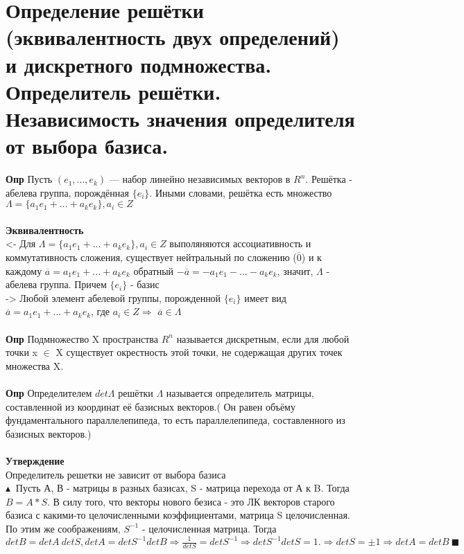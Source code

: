 \section{Определение решётки (эквивалентность двух определений) и дискретного подмножества. Определитель решётки. Независимость значения определителя от выбора базиса.}
\textbf{Опр} Пусть $( e_1, . . . , e_k)$ — набор линейно независимых векторов в $R^n$. Решётка - абелева группа, порождённая $\{e_i\}$. Иными словами, решётка есть множество $\Lambda = \{a_1 e_1 + ... + a_k e_k\}, a_i \in Z$
\\
\\
\textbf{Эквивалентность}\\
<- Для $\Lambda = \{a_1 e_1 + ... + a_k e_k\}, a_i \in Z$ выполяняются ассоциативность и коммутативность сложения, существует нейтральный по сложению ($\overline{0}$) и к каждому $\overline{a} = a_1 e_1 + ... + a_k e_k$ обратный $-\overline{a} = -a_1 e_1 - ... - a_k e_k$, значит, $\Lambda$ - абелева группа. Причем $\{e_i\}$ - базис\\
-> Любой элемент абелевой группы, порожденной $\{e_i\}$ имеет вид $\overline{a} = a_1 e_1 + ... + a_k e_k$, где $a_i \in Z \Longrightarrow$  $\overline{a} \in \Lambda$
\\
\\
\textbf{Опр} Подмножество X пространства $R^n$ называется дискретным, если для любой точки x $\in$ X существует окрестность этой точки, не содержащая других точек множества X.
\\
\\
\textbf{Опр} Определителем $det \Lambda$ решётки $\Lambda$ называется определитель матрицы, составленной из координат её базисных векторов.( Он равен объёму фундаментального параллелепипеда, то есть
параллелепипеда, составленного из базисных векторов.)
\\
\\
\textbf{Утверждение}
\\
Определитель решетки не зависит от выбора базиса
\\
$\blacktriangle \ $ Пусть А, В - матрицы в разных базисах, S - матрица перехода от А к B. Тогда $B = A*S$. В силу того, что векторы нового безиса - это ЛК векторов старого базиса с какими-то целочисленными коэффициентами, матрица S целочисленная. По этим же соображениям, $S^{-1}$ - целочисленная матрица. Тогда\\
$det B = det A \ det S, det A = det S^{-1} det B \Longrightarrow \frac{1}{det S} = det S^{-1} \Longrightarrow det S^{-1} det S = 1. \Longrightarrow det S = \pm1 \Longrightarrow det A = det B \ \blacksquare $

